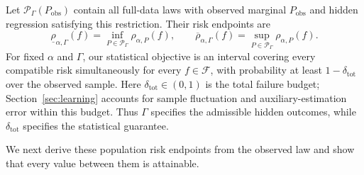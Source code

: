 Let \(\mathcal P_\Gamma(P_{\mathrm{obs}})\) contain all full-data laws with observed marginal \(P_{\mathrm{obs}}\) and hidden regression satisfying this restriction. Their risk endpoints are
\begin{equation}
 \underline\rho_{\alpha,\Gamma}(f)
 =\inf_{P\in\mathcal P_\Gamma}\rho_{\alpha,P}(f),
 \qquad
 \overline\rho_{\alpha,\Gamma}(f)
 =\sup_{P\in\mathcal P_\Gamma}\rho_{\alpha,P}(f).
\label{eq:population-endpoints}
\end{equation}
For fixed \(\alpha\) and \(\Gamma\), our statistical objective is an interval covering every compatible risk simultaneously for every \(f\in\mathcal F\), with probability at least \(1-\delta_{\mathrm{tot}}\) over the observed sample. Here \(\delta_{\mathrm{tot}}\in(0,1)\) is the total failure budget; Section~\ref{sec:learning} accounts for sample fluctuation and auxiliary-estimation error within this budget. Thus \(\Gamma\) specifies the admissible hidden outcomes, while \(\delta_{\mathrm{tot}}\) specifies the statistical guarantee.

We next derive these population risk endpoints from the observed law and show that every value between them is attainable.

